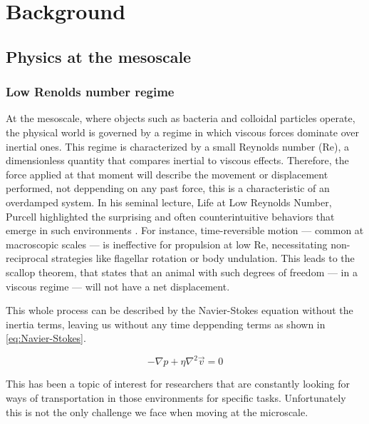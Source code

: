 



\part{Background}
\label{part:background}

\chapter{Physics at the mesoscale}
\label{ch:swimming at the mesoscale}


\section{Low Renolds number regime}
\label{st:lowreynoldsnumber}

At the mesoscale, where objects such as bacteria and colloidal particles operate, the physical world is governed by a regime in which viscous forces dominate over inertial ones. This regime is characterized by a small Reynolds number (Re), a dimensionless quantity that compares inertial to viscous effects. Therefore, the force applied at that moment will describe the movement or displacement performed, not deppending on any past force, this is a characteristic of an overdamped system. In his seminal lecture, Life at Low Reynolds Number, Purcell highlighted the surprising and often counterintuitive behaviors that emerge in such environments \cite{purcell2014life}. For instance, time-reversible motion — common at macroscopic scales — is ineffective for propulsion at low Re, necessitating non-reciprocal strategies like flagellar rotation or body undulation. This leads to the scallop theorem, that states that an animal with such degrees of freedom — in a viscous regime — will not have a net displacement. 

This whole process can be described by the Navier-Stokes equation without the inertia terms, leaving us without any time deppending terms as shown in \ref{eq:Navier-Stokes}. 

\begin{equation}
  - \nabla p + \eta \nabla ^2 \vec{v} = 0
  \label{eq:Navier-Stokes}
\end{equation}

This has been a topic of interest for researchers that are constantly looking for ways of transportation in those environments for specific tasks. Unfortunately this is not the only challenge we face when moving at the microscale.

